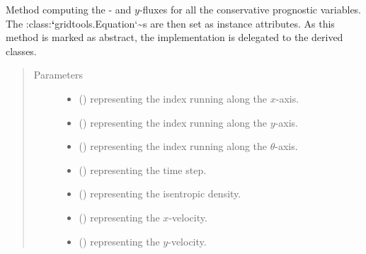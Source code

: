 \documentclass[letterpaper,10pt,english]{sphinxmanual}
\begin{document}
\begin{fulllineitems}
\begin{fulllineitems}
\label{\detokenize{api:dycore.flux_isentropic.FluxIsentropic._compute_horizontal_fluxes}}
Method computing the - and
\(y\)-fluxes for all the conservative prognostic variables.
The :class:{\color{red}\bfseries{}{}`}gridtools.Equation{}`\textasciitilde{}s are then set as instance attributes.
As this method is marked as abstract, the implementation is delegated to the derived classes.
\begin{quote}\begin{description}
\item[{Parameters}] \leavevmode\begin{itemize}
\item {} 
 () \textendash{}  representing the index running along the \(x\)-axis.

\item {} 
 () \textendash{}  representing the index running along the \(y\)-axis.

\item {} 
 () \textendash{}  representing the index running along the \(\theta\)-axis.

\item {} 
 () \textendash{}  representing the time step.

\item {} 
 () \textendash{}  representing the isentropic density.

\item {} 
 () \textendash{}  representing the \(x\)-velocity.

\item {} 
 () \textendash{}  representing the \(y\)-velocity.


\end{itemize}
\end{description}
\end{quote}
\end{fulllineitems}
\end{fulllineitems}
\end{document}
